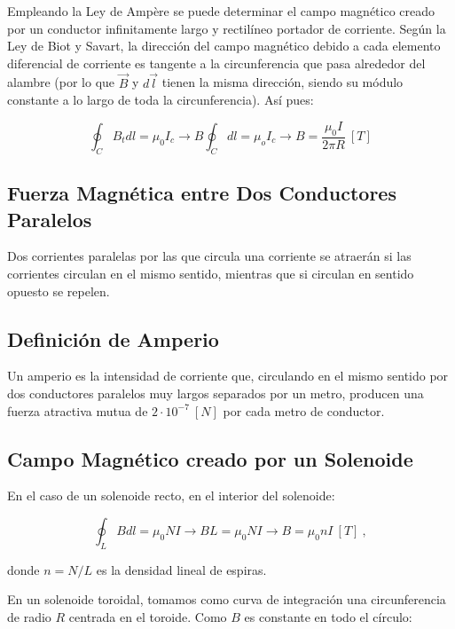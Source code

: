 \documentclass{tufte-handout}
\begin{document}
Empleando la Ley de Ampère se puede determinar el campo magnético creado por un conductor infinitamente largo y rectilíneo portador de corriente. Según la Ley de Biot y Savart, la dirección del campo magnético debido a cada elemento diferencial de corriente es tangente a la circunferencia que pasa alrededor del alambre (por lo que $\vec{B}$ y $d\vec{l}$ tienen la misma dirección, siendo su módulo constante a lo largo de toda la circunferencia). Así pues:

\begin{equation}
\oint_C B_t dl = \mu_0 I_c \rightarrow B \oint_C dl = \mu_o I_c \rightarrow B = \frac{\mu_0 I}{2\pi R}~[T]
\end{equation}

\subsection{Fuerza Magnética entre Dos Conductores Paralelos}

Dos corrientes paralelas por las que circula una corriente se atraerán si las corrientes circulan en el mismo sentido, mientras que si circulan en sentido opuesto se repelen.

\subsection{Definición de Amperio}

Un amperio es la intensidad de corriente que, circulando en el mismo sentido por dos conductores paralelos muy largos separados por un metro, producen una fuerza atractiva mutua de $2\cdot 10^{-7}~[N]$ por cada metro de conductor.

\subsection{Campo Magnético creado por un Solenoide}

En el caso de un solenoide recto, en el interior del solenoide:

\begin{equation}
\oint_L B dl = \mu_0 N I \rightarrow BL = \mu_0 N I \rightarrow B = \mu_0 n I~[T]~,
\end{equation}

donde $n = N/L$ es la densidad lineal de espiras.

En un solenoide toroidal, tomamos como curva de integración una circunferencia de radio $R$ centrada en el toroide. Como $B$ es constante en todo el círculo:
\end{document}
